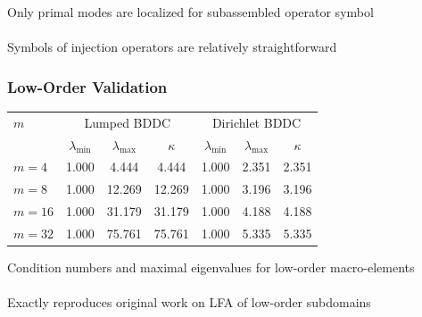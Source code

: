 \documentclass{beamer}
\begin{document}
\begin{frame}
\begin{center}
Only primal modes are localized for subassembled operator symbol\\

~\\

Symbols of injection operators are relatively straightforward\\

\end{center}
\end{frame}


\begin{frame}
\begin{center}
\frametitle{Low-Order Validation}

\begin{table}[ht!]
\begin{center}
\begin{tabular}{l ccc ccc}
  \toprule
  $m$  &  \multicolumn{3}{c}{Lumped BDDC}  &  \multicolumn{3}{c}{Dirichlet BDDC}  \\
                      &  $\lambda_{\min}$  &  $\lambda_{\max}$  &  $\kappa$ & $\lambda_{\min}$  &  $\lambda_{\max}$ & $\kappa$  \\
  \toprule
  $m = 4$   &  1.000  &   4.444  &   4.444  &  1.000  &  2.351  &  2.351  \\
  $m = 8$   &  1.000  &  12.269  &  12.269  &  1.000  &  3.196  &  3.196  \\
  $m = 16$  &  1.000  &  31.179  &  31.179  &  1.000  &  4.188  &  4.188  \\
  $m = 32$  &  1.000  &  75.761  &  75.761  &  1.000  &  5.335  &  5.335  \\
  \bottomrule
\end{tabular}
\end{center}
\label{table:macro_element_bddc}
\end{table}
{\small Condition numbers and maximal eigenvalues for low-order macro-elements}\\

~\\

Exactly reproduces original work on LFA of low-order subdomains

\end{center}
\end{frame}

\end{document}
